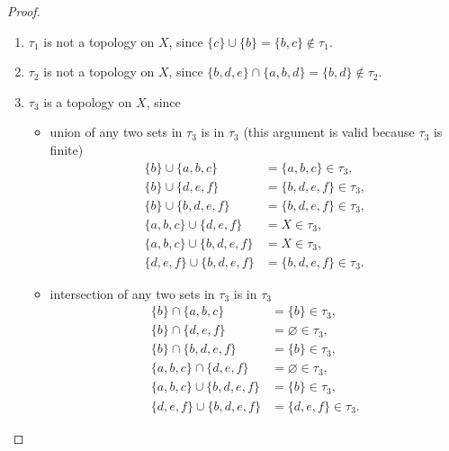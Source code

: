 \begin{proof}
	\begin{enumerate}[label={(\alph*)}]
		\item $\tau_{1}$ is not a topology on $X$, since $\{ c \}\cup\{ b \} = \{ b, c \}\notin \tau_{1}$.
		\item $\tau_{2}$ is not a topology on $X$, since $\{ b, d, e \}\cap \{ a, b, d \} = \{ b, d \}\notin\tau_{2}$.
		\item $\tau_{3}$ is a topology on $X$, since
		      \begin{itemize}
			      \item union of any two sets in $\tau_{3}$ is in $\tau_{3}$ (this argument is valid because $\tau_{3}$ is finite)
			            \begin{align*}
				            \{ b \} \cup \{ a, b, c \}          & = \{ a, b, c \}\in \tau_{3},    \\
				            \{ b \} \cup \{ d, e, f \}          & = \{ b, d, e, f \}\in \tau_{3}, \\
				            \{ b \} \cup \{ b, d, e, f \}       & = \{ b, d, e, f \}\in \tau_{3}, \\
				            \{ a, b, c \} \cup \{ d, e, f \}    & = X\in \tau_{3},                \\
				            \{ a, b, c \} \cup \{ b, d, e, f \} & = X\in \tau_{3},                \\
				            \{ d, e, f \} \cup \{ b, d, e, f \} & = \{ b, d, e, f \}\in \tau_{3}.
			            \end{align*}
			      \item intersection of any two sets in $\tau_{3}$ is in $\tau_{3}$
			            \begin{align*}
				            \{ b \} \cap \{ a, b, c \}          & = \{ b \}\in \tau_{3},       \\
				            \{ b \} \cap \{ d, e, f \}          & = \varnothing\in \tau_{3},   \\
				            \{ b \} \cap \{ b, d, e, f \}       & = \{ b \}\in \tau_{3},       \\
				            \{ a, b, c \} \cap \{ d, e, f \}    & = \varnothing\in \tau_{3},   \\
				            \{ a, b, c \} \cup \{ b, d, e, f \} & = \{ b \}\in \tau_{3},       \\
				            \{ d, e, f \} \cup \{ b, d, e, f \} & = \{ d, e, f \}\in \tau_{3}.
			            \end{align*}
		      \end{itemize}
	\end{enumerate}
\end{proof}
\newpage

